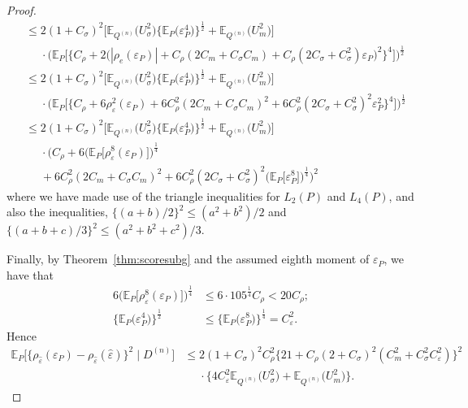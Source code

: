 \documentclass[aos]{imsart}
\newcommand{\E}{\mathbb{E}}
\begin{document}
\begin{proof}
\begin{align*}
			&\leq 2(1+C_\sigma)^2\Big[\E_{Q^{(n)}}\big(U_\sigma^2\big)\big\{\E_P\big(\varepsilon_P^4\big)\big\}^{\frac12}+\E_{Q^{(n)}}\big(U_m^2\big)\Big]\\
			&\phantom{\leq}\cdot \bigg(\E_P\bigg[\Big\{C_\rho + 2\big(|\rho_{e} (\varepsilon_P)|  + C_\rho(2 C_m+C_\sigma C_m) + C_\rho (2C_\sigma+C_\sigma^2)\varepsilon_P\big)^2\Big\}^4 \bigg]\bigg)^{\frac12}\\
			&\leq 2(1+C_\sigma)^2\Big[\E_{Q^{(n)}}\big(U_\sigma^2\big)\big\{\E_P\big(\varepsilon_P^4\big)\big\}^{\frac12}+\E_{Q^{(n)}}\big(U_m^2\big)\Big]\\
			&\phantom{\leq}\cdot \Big(\E_P\Big[\big\{C_\rho + 6\rho^2_\varepsilon (\varepsilon_P)  + 6C_\rho^2(2 C_m+C_\sigma C_m)^2 + 6C_\rho^2 (2C_\sigma+C_\sigma^2)^2\varepsilon_P^2\big\}^4 \Big]\Big)^{\frac12}\\
			&\leq 2(1+C_\sigma)^2\Big[\E_{Q^{(n)}}\big(U_\sigma^2\big)\big\{\E_P\big(\varepsilon_P^4\big)\big\}^{\frac12}+\E_{Q^{(n)}}\big(U_m^2\big)\Big]\\
			&\phantom{\leq}\cdot \bigg(C_\rho + 6\Big(\E_P\big[\rho^8_\varepsilon (\varepsilon_P)\big]\Big)^\frac14  \\
			&\phantom{\leq}+ 6C_\rho^2(2 C_m+C_\sigma C_m)^2 + 6C_\rho^2 (2C_\sigma+C_\sigma^2)^2\Big(\E_P\big[\varepsilon_P^8\big]\Big)^{\frac14}\bigg)^2
		\end{align*}
		where we have made use of the triangle inequalities for $L_2(P)$ and $L_4(P)$, and also the inequalities, $\{(a+b)/2\}^2 \leq (a^2+b^2)/2$ and $\{(a+b+c)/3\}^2 \leq (a^2+b^2+c^2)/3$.
		
		Finally, by Theorem~\ref{thm:scoresubg} and the assumed eighth moment of $\varepsilon_P$, we have that \begin{align*}
			6\Big(\E_P\big[\rho^8_\varepsilon (\varepsilon_P)\big]\Big)^\frac14 &\leq 6\cdot 105^\frac14C_\rho < 20 C_\rho;\\
			\big\{\E_P\big(\varepsilon_P^4\big)\big\}^{\frac12} & \leq \{\E_P\big(\varepsilon_P^8\big)\big\}^{\frac14} = C_\varepsilon^2.
		\end{align*}
		Hence \begin{align*}
			\E_P\Big[\big\{\rho_{\hat\varepsilon}(\varepsilon_P)-\rho_{\hat\varepsilon}(\hat\varepsilon)\big\}^2 \; \Big| \; D^{(n)}\Big] &\leq 2(1+C_\sigma)^2 C_\rho^2\big\{21  + C_\rho(2+C_\sigma)^2(C_m^2 +C_\sigma^2C_\varepsilon^2)\big\}^2 \\
			&\phantom{\leq} \cdot \Big\{4C_\varepsilon^2 \E_{Q^{(n)}}\big(U_\sigma^2\big)+\E_{Q^{(n)}}\big(U_m^2\big)\Big\}.
		\end{align*}
	\end{proof}
	
\end{document}
